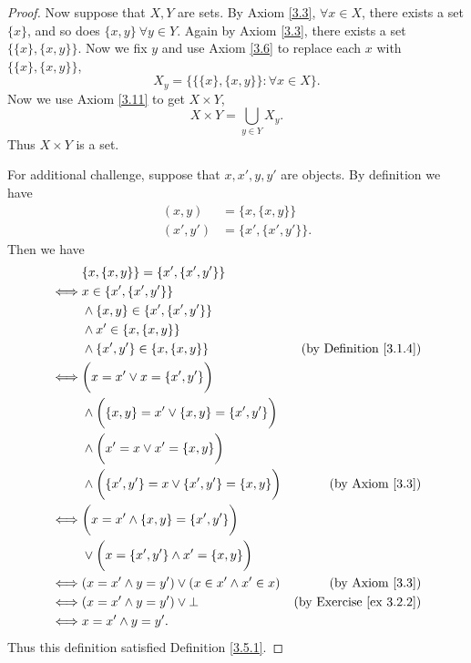 \begin{proof}
    Now suppose that \(X, Y\) are sets.
    By Axiom \ref{3.3}, \(\forall x \in X\), there exists a set \(\{x\}\), and so does \(\{x, y\} \ \forall y \in Y\).
    Again by Axiom \ref{3.3}, there exists a set \(\{\{x\}, \{x, y\}\}\).
    Now we fix \(y\) and use Axiom \ref{3.6} to replace each \(x\) with \(\{\{x\}, \{x, y\}\}\),
    \[
        X_y = \{\{\{x\}, \{x, y\}\} : \forall x \in X\}.
    \]
    Now we use Axiom \ref{3.11} to get \(X \times Y\),
    \[
        X \times Y = \bigcup_{y \in Y} X_y.
    \]
    Thus \(X \times Y\) is a set.

    For additional challenge, suppose that \(x, x', y, y'\) are objects.
    By definition we have
    \begin{align*}
        (x, y)   & = \{x, \{x, y\}\}     \\
        (x', y') & = \{x', \{x', y'\}\}.
    \end{align*}
    Then we have
    \begin{align*}
             & \{x, \{x, y\}\} = \{x', \{x', y'\}\}                                                              \\
        \iff & x \in \{x', \{x', y'\}\}                                                                          \\
             & \land \{x, y\} \in \{x', \{x', y'\}\}                                                             \\
             & \land x' \in \{x, \{x, y\}\}                                                                      \\
             & \land \{x', y'\} \in \{x, \{x, y\}\}                        & \text{(by Definition \ref{3.1.4})}  \\
        \iff & \bigg(x = x' \lor x = \{x', y'\}\bigg)                                                            \\
             & \land \bigg(\{x, y\} = x' \lor \{x, y\} = \{x', y'\}\bigg)                                        \\
             & \land \bigg(x' = x \lor x' = \{x, y\}\bigg)                                                       \\
             & \land \bigg(\{x', y'\} = x \lor \{x', y'\} = \{x, y\}\bigg) & \text{(by Axiom \ref{3.3})}         \\
        \iff & \bigg(x = x' \land \{x, y\} = \{x', y'\}\bigg)                                                    \\
             & \lor \bigg(x = \{x', y'\} \land x' = \{x, y\}\bigg)                                               \\
        \iff & (x = x' \land y = y') \lor (x \in x' \land x' \in x)        & \text{(by Axiom \ref{3.3})}         \\
        \iff & (x = x' \land y = y') \lor \bot                             & \text{(by Exercise \ref{ex 3.2.2})} \\
        \iff & x = x' \land y = y'.
    \end{align*}
    Thus this definition satisfied Definition \ref{3.5.1}.
\end{proof}

